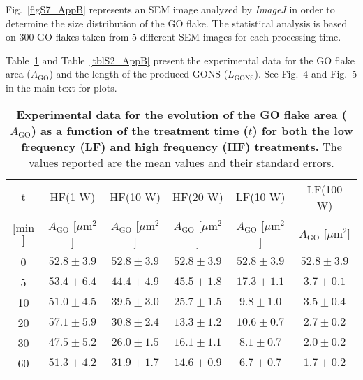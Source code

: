 Fig.~\ref{figS7_AppB} represents an SEM image analyzed by \textit{ImageJ} in order to determine the size distribution of the GO flake. The statistical analysis is based on 300 GO flakes taken from 5 different SEM images for each processing time.

\clearpage


Table~\ref{tblS1_AppB} and Table~\ref{tblS2_AppB} present the experimental data for the GO flake area ($A_{\mathrm{GO}}$) and the length of the produced GONS ($L_{\mathrm{GONS}}$). See Fig.~4 and Fig.~5 in the main text for plots.

\begin{table}[h]
 \begin{center}
 \caption{\textbf{Experimental data for the evolution of the GO flake area ($A_{\mathrm{GO}}$) as a function of the treatment time ($t$) for both the low frequency (LF) and high frequency (HF) treatments.} The values reported are the mean values and their standard errors.}
  \label{tblS1_AppB}
  \begin{tabular}{c|c|c|c|c|c}
        \hline
         t & HF(1 W) & HF(10 W) & HF(20 W) & LF(10 W) & LF(100 W) \\
         $[$min$]$ & $A_{\mathrm{GO}}$ [$\mu$m$^{2}$] & $A_{\mathrm{GO}}$ [$\mu$m$^{2}$] & $A_{\mathrm{GO}}$ [$\mu$m$^{2}$] & $A_{\mathrm{GO}}$ [$\mu$m$^{2}$] & $A_{\mathrm{GO}}$ [$\mu$m$^{2}$] \\
        \hline
        0 & $52.8 \pm 3.9$ & $52.8 \pm 3.9$ & $52.8 \pm 3.9$ & $52.8 \pm 3.9$ & $52.8 \pm 3.9$ \\
        5 & $53.4 \pm 6.4$ & $44.4 \pm 4.9$ & $45.5\pm 1.8$ & $17.3 \pm 1.1$ & $3.7 \pm 0.1$ \\
        10 & $51.0 \pm 4.5$ & $39.5 \pm 3.0$ & $25.7 \pm 1.5$ & $9.8 \pm 1.0$ & $3.5 \pm 0.4$ \\
        20 & $57.1 \pm 5.9$ & $30.8 \pm 2.4$ & $13.3 \pm 1.2$ & $10.6 \pm 0.7$ & $2.7 \pm 0.2$ \\
        30 & $47.5 \pm 5.2$ & $26.0 \pm 1.5$ & $16.1 \pm 1.1$ & $8.1 \pm 0.7$ & $2.0 \pm 0.2$ \\
        60 & $51.3 \pm 4.2$ & $31.9 \pm 1.7$ & $14.6 \pm 0.9$ & $6.7 \pm 0.7$ & $1.7 \pm 0.2$ \\
        \hline
  \end{tabular}
 \end{center}
\end{table}

